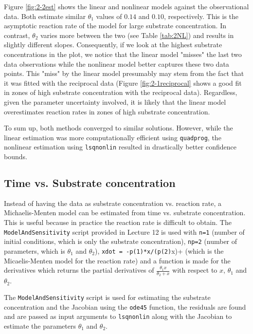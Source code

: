 Figure \ref{fig:2-2est} shows the linear and nonlinear models against the observational data. Both estimate similar $\theta_1$ values of $0.14$ and $0.10$, respectively. This is the asymptotic reaction rate of the model for large substrate concentration. In contrast, $\theta_2$ varies more between the two (see Table \ref{tab:2NL}) and results in slightly different slopes. Consequently, if we look at the highest substrate concentrations in the plot, we notice that the linear model "misses" the last two data observations while the nonlinear model better captures these two data points. This "miss" by the linear model presumably may stem from the fact that it was fitted with the reciprocal data (Figure \ref{fig:2-1reciprocal} shows a good fit in zones of high substrate concentration with the reciprocal data). Regardless, given the parameter uncertainty involved, it is likely that the linear model overestimates reaction rates in zones of high substrate concentration.   

To sum up, both methods converged to similar solutions. However, while the linear estimation was more computationally efficient using \texttt{quadprog}, the nonlinear estimation using \texttt{lsqnonlin} resulted in drastically better confidence bounds.  

\subsection{Time vs. Substrate concentration}

Instead of having the data as substrate concentration vs. reaction rate, a Michaelis-Menten model can be estimated from time vs. substrate concentration. This is useful because in practice the reaction rate is difficult to obtain. The \texttt{ModelAndSensitivity} script provided in Lecture 12 is used with \verb+n=1+ (number of initial conditions, which is only the substrate concentration), \verb+np=2+ (number of parameters, which is $\theta_1$ and $\theta_2$), \verb+xdot = -p(1)*x/(p(2)+x)+ (which is the Micaelis-Menten model for the reaction rate) and a function is made for the derivatives which returns the partial derivatives of $\frac{\theta_1 x}{\theta_2 + x}$ with respect to $x$, $\theta_1$ and $\theta_2$. 

The \texttt{ModelAndSensitivity} script is used for estimating the substrate concentration and the Jacobian using the \verb+ode45+ function, the residuals are found and are passed as input arguments to \verb+lsqnonlin+ along with the Jacobian to estimate the parameters $\theta_1$ and $\theta_2$. 

